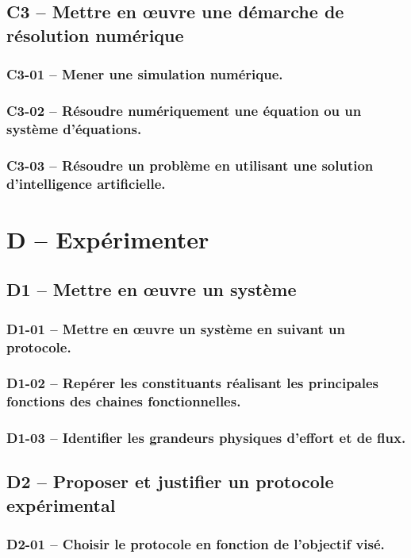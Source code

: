 \subsection{C3 -- Mettre en œuvre une démarche de résolution numérique}  
\subsubsection*{C3-01 -- Mener une simulation numérique. }  
\subsubsection*{C3-02 -- Résoudre numériquement une équation ou un système d'équations. }  
\subsubsection*{C3-03 -- Résoudre un problème en utilisant une solution d'intelligence artificielle. }  
\section{D -- Expérimenter}  
\subsection{D1 -- Mettre en œuvre un système}  
\subsubsection*{D1-01 -- Mettre en œuvre un système en suivant un protocole.}  
\subsubsection*{D1-02 -- Repérer les constituants réalisant les principales fonctions des chaines fonctionnelles.}  
\subsubsection*{D1-03 -- Identifier les grandeurs physiques d’effort et de flux.}  
\subsection{D2 -- Proposer et justifier un protocole expérimental}  
\subsubsection*{D2-01 -- Choisir le protocole en fonction de l'objectif visé.}  

